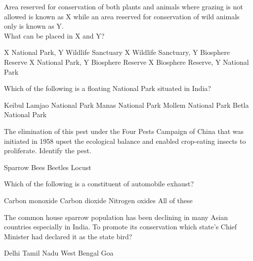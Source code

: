 \begin{questions}
    \question Area reserved for conservation of both plants and animals where grazing is not allowed is known as X while an area reserved for conservation of wild animals only is known as Y. \\ What can be placed in X and Y?

    \begin{randomizechoices}
        \CorrectChoice X \textendash National Park, Y \textendash Wildlife Sanctuary
        \choice X \textendash Wildlife Sanctuary, Y \textendash Biosphere Reserve
        \choice X \textendash National Park, Y \textendash Biosphere Reserve
        \choice X \textendash Biosphere Reserve, Y \textendash National Park
    \end{randomizechoices}

    \question Which of the following is a floating National Park situated in India?

    \begin{randomizeoneparchoices}
        \CorrectChoice Keibul Lamjao National Park
        \choice Manas National Park
        \choice Mollem National Park
        \choice Betla National Park
    \end{randomizeoneparchoices}

    \question The elimination of this pest under the Four Pests Campaign of China that was initiated in 1958 upset the ecological balance and enabled crop-eating insects to proliferate. Identify the pest.

    \begin{randomizeoneparchoices}
        \CorrectChoice Sparrow
        \choice Bees
        \choice Beetles
        \choice Locust
    \end{randomizeoneparchoices}

    \question Which of the following is a constituent of automobile exhaust?

    \begin{choices}
        \choice Carbon monoxide
        \choice Carbon dioxide
        \choice Nitrogen oxides
        \CorrectChoice All of these
    \end{choices}

    \question The common house sparrow population has been declining in many Asian countries especially in India. To promote its conservation which state's Chief Minister had declared it as the state bird?

    \begin{randomizeoneparchoices}
        \CorrectChoice Delhi
        \choice Tamil Nadu
        \choice West Bengal
        \choice Goa
    \end{randomizeoneparchoices}


\end{questions}
